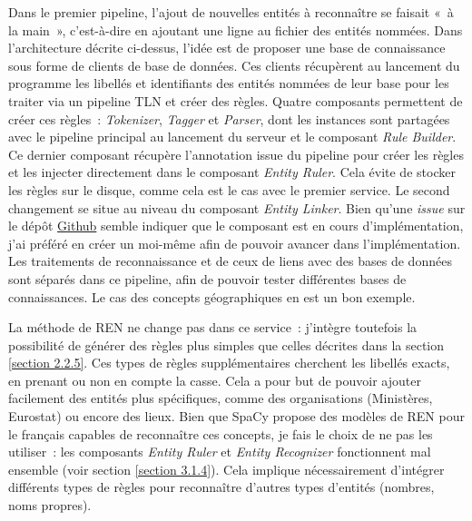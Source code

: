 Dans le premier pipeline, l'ajout de nouvelles entités à reconnaître se faisait «~à la main~», c'est-à-dire en ajoutant une ligne au fichier des entités nommées. Dans l'architecture décrite ci-dessus, l'idée est de proposer une base de connaissance sous forme de clients de base de données. Ces clients récupèrent au lancement du programme les libellés et identifiants des entités nommées de leur base pour les traiter via un pipeline TLN et créer des règles. Quatre composants permettent de créer ces règles~: \textit{Tokenizer}, \textit{Tagger} et \textit{Parser}, dont les instances sont partagées avec le pipeline principal au lancement du serveur et le composant \textit{Rule Builder}. Ce dernier composant récupère l'annotation issue du pipeline pour créer les règles et les injecter directement dans le composant \textit{Entity Ruler}. Cela évite de stocker les règles sur le disque, comme cela est le cas avec le premier service.
Le second changement se situe au niveau du composant \textit{Entity Linker}. Bien qu'une \textit{issue} sur le dépôt \href{https://github.com/explosion/spaCy/issues}{Github} \cite{spacy-repo} semble indiquer que le composant est en cours d'implémentation, j'ai préféré en créer un moi-même afin de pouvoir avancer dans l'implémentation. Les traitements de reconnaissance et de ceux de liens avec des bases de données sont séparés dans ce pipeline, afin de pouvoir tester différentes bases de connaissances. Le cas des concepts géographiques en est un bon exemple.
\newline

La méthode de REN ne change pas dans ce service~: j'intègre toutefois la possibilité de générer des règles plus simples que celles décrites dans la section \ref{section 2.2.5}. Ces types de règles supplémentaires cherchent les libellés exacts, en prenant ou non en compte la casse. Cela a pour but de pouvoir ajouter facilement des entités plus spécifiques, comme des organisations (Ministères, Eurostat) ou encore des lieux. Bien que SpaCy propose des modèles de REN pour le français capables de reconnaître ces concepts, je fais le choix de ne pas les utiliser~: les composants \textit{Entity Ruler} et \textit{Entity Recognizer} fonctionnent mal ensemble (voir section \ref{section 3.1.4}). Cela implique nécessairement d'intégrer différents types de règles pour reconnaître d'autres types d'entités (nombres, noms propres). 
\newline

